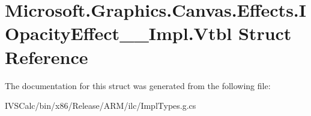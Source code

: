 \hypertarget{struct_microsoft_1_1_graphics_1_1_canvas_1_1_effects_1_1_i_opacity_effect_____impl_1_1_vtbl}{}\section{Microsoft.\+Graphics.\+Canvas.\+Effects.\+I\+Opacity\+Effect\+\_\+\+\_\+\+Impl.\+Vtbl Struct Reference}
\label{struct_microsoft_1_1_graphics_1_1_canvas_1_1_effects_1_1_i_opacity_effect_____impl_1_1_vtbl}


The documentation for this struct was generated from the following file\+:\begin{DoxyCompactItemize}
\item 
I\+V\+S\+Calc/bin/x86/\+Release/\+A\+R\+M/ilc/Impl\+Types.\+g.\+cs\end{DoxyCompactItemize}
